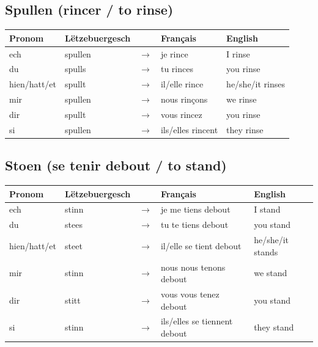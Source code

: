 \subsection*{Spullen (rincer / to rinse)}
\begin{tabular}{ll c l l}
\toprule
\textbf{Pronom} & \textbf{Lëtzebuergesch} & \textbf{} & \textbf{Français} & \textbf{English} \\
\midrule
ech & spullen & $\rightarrow$ & je rince & I rinse \\
du & spulls & $\rightarrow$ & tu rinces & you rinse \\
hien/hatt/et & spullt & $\rightarrow$ & il/elle rince & he/she/it rinses \\
mir & spullen & $\rightarrow$ & nous rinçons & we rinse \\
dir & spullt & $\rightarrow$ & vous rincez & you rinse \\
si & spullen & $\rightarrow$ & ils/elles rincent & they rinse \\
\bottomrule
\end{tabular}

\subsection*{Stoen (se tenir debout / to stand)}
\begin{tabular}{ll c l l}
\toprule
\textbf{Pronom} & \textbf{Lëtzebuergesch} & \textbf{} & \textbf{Français} & \textbf{English} \\
\midrule
ech & stinn & $\rightarrow$ & je me tiens debout & I stand \\
du & stees & $\rightarrow$ & tu te tiens debout & you stand \\
hien/hatt/et & steet & $\rightarrow$ & il/elle se tient debout & he/she/it stands \\
mir & stinn & $\rightarrow$ & nous nous tenons debout & we stand \\
dir & stitt & $\rightarrow$ & vous vous tenez debout & you stand \\
si & stinn & $\rightarrow$ & ils/elles se tiennent debout & they stand \\
\bottomrule
\end{tabular}

